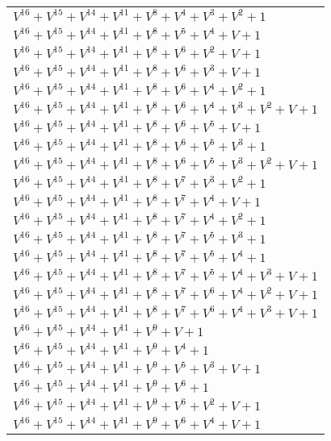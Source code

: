 \documentclass[12pt]{article}
\begin{document}
\begin{adjustwidth}{-4cm}{}
\begin{center}
\begin{longtable}{|l|}
$V^{16}  +V^{15}  +V^{14}  +V^{11}  +V^{8}  +V^{4}  +V^{3}  +V^{2}  + 1$ \\
$V^{16}  +V^{15}  +V^{14}  +V^{11}  +V^{8}  +V^{5}  +V^{4}  + V + 1$ \\
$V^{16}  +V^{15}  +V^{14}  +V^{11}  +V^{8}  +V^{6}  +V^{2}  + V + 1$ \\
$V^{16}  +V^{15}  +V^{14}  +V^{11}  +V^{8}  +V^{6}  +V^{3}  + V + 1$ \\
$V^{16}  +V^{15}  +V^{14}  +V^{11}  +V^{8}  +V^{6}  +V^{4}  +V^{2}  + 1$ \\
$V^{16}  +V^{15}  +V^{14}  +V^{11}  +V^{8}  +V^{6}  +V^{4}  +V^{3}  +V^{2}  + V + 1$ \\
$V^{16}  +V^{15}  +V^{14}  +V^{11}  +V^{8}  +V^{6}  +V^{5}  + V + 1$ \\
$V^{16}  +V^{15}  +V^{14}  +V^{11}  +V^{8}  +V^{6}  +V^{5}  +V^{3}  + 1$ \\
$V^{16}  +V^{15}  +V^{14}  +V^{11}  +V^{8}  +V^{6}  +V^{5}  +V^{3}  +V^{2}  + V + 1$ \\
$V^{16}  +V^{15}  +V^{14}  +V^{11}  +V^{8}  +V^{7}  +V^{3}  +V^{2}  + 1$ \\
$V^{16}  +V^{15}  +V^{14}  +V^{11}  +V^{8}  +V^{7}  +V^{4}  + V + 1$ \\
$V^{16}  +V^{15}  +V^{14}  +V^{11}  +V^{8}  +V^{7}  +V^{4}  +V^{2}  + 1$ \\
$V^{16}  +V^{15}  +V^{14}  +V^{11}  +V^{8}  +V^{7}  +V^{5}  +V^{3}  + 1$ \\
$V^{16}  +V^{15}  +V^{14}  +V^{11}  +V^{8}  +V^{7}  +V^{5}  +V^{4}  + 1$ \\
$V^{16}  +V^{15}  +V^{14}  +V^{11}  +V^{8}  +V^{7}  +V^{5}  +V^{4}  +V^{3}  + V + 1$ \\
$V^{16}  +V^{15}  +V^{14}  +V^{11}  +V^{8}  +V^{7}  +V^{6}  +V^{4}  +V^{2}  + V + 1$ \\
$V^{16}  +V^{15}  +V^{14}  +V^{11}  +V^{8}  +V^{7}  +V^{6}  +V^{4}  +V^{3}  + V + 1$ \\
$V^{16}  +V^{15}  +V^{14}  +V^{11}  +V^{9}  + V + 1$ \\
$V^{16}  +V^{15}  +V^{14}  +V^{11}  +V^{9}  +V^{4}  + 1$ \\
$V^{16}  +V^{15}  +V^{14}  +V^{11}  +V^{9}  +V^{5}  +V^{3}  + V + 1$ \\
$V^{16}  +V^{15}  +V^{14}  +V^{11}  +V^{9}  +V^{6}  + 1$ \\
$V^{16}  +V^{15}  +V^{14}  +V^{11}  +V^{9}  +V^{6}  +V^{2}  + V + 1$ \\
$V^{16}  +V^{15}  +V^{14}  +V^{11}  +V^{9}  +V^{6}  +V^{4}  + V + 1$ \\

\end{longtable}
\end{center}
\end{adjustwidth}
\end{document}
